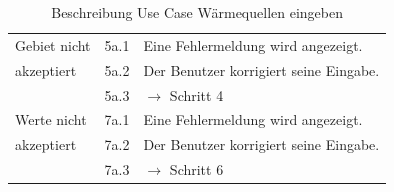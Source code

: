 \begin{table} [H]
\begin{tabular}{|l|l|l|}
		\hline
		Gebiet nicht & 5a.1 & Eine Fehlermeldung wird angezeigt.\\
		\cline{2-3}
		akzeptiert 	& 5a.2	& Der Benutzer korrigiert seine Eingabe.\\
		\cline{2-3}
					& 5a.3 	& $\rightarrow$ Schritt 4\\
		\hline
		Werte nicht & 7a.1 	& Eine Fehlermeldung wird angezeigt.\\
		\cline{2-3}
		akzeptiert 	& 7a.2	& Der Benutzer korrigiert seine Eingabe.\\
		\cline{2-3}
					& 7a.3 	& $\rightarrow$ Schritt 6\\
		\hline
	\end{tabular}
	\caption{Beschreibung Use Case Wärmequellen eingeben}
	\label{Beschreibung Use Case Wärmequellen eingeben}
\end{table}

